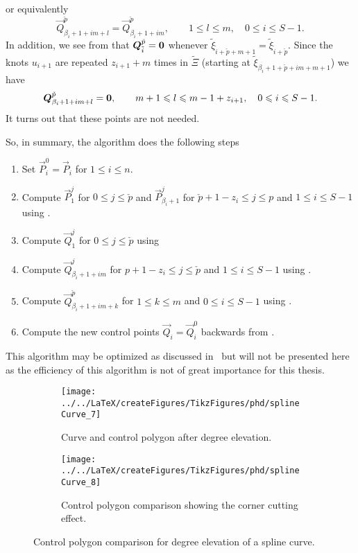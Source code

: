 or equivalently
\begin{equation}\label{Eq:coeffFormula5}
	\vec{Q}_{\beta_i+1+i m+l}^{\check{p}} = \vec{Q}_{\beta_i+1+i m}^{\check{p}},\qquad 1 \leq l \leq m,\quad 0\leq i \leq S-1. 
\end{equation}
In addition, we see from  that $\vec{Q}_{\tilde{i}}^{\check{p}}=\zerovec$ whenever $\tilde{\xi}_{\tilde{i}+\check{p}+m+1} = \tilde{\xi}_{\tilde{i}+\check{p}}$. Since the knots $u_{i+1}$ are repeated $z_{i+1}+m$ times in $\tilde{\Xi}$ (starting at $\tilde{\xi}_{\beta_i+1+\check{p}+im+m+1}$) we have
\begin{equation*}
	\vec{Q}_{\beta_i+1+i m+l}^{\check{p}}=\zerovec,\qquad m+1 \leq l \leq m - 1 + z_{i+1},\quad 0\leq i \leq S-1. 
\end{equation*}
It turns out that these points are not needed.

So, in summary, the algorithm does the following steps
\begin{enumerate}
	\item Set $\vec{P}_i^0 = \vec{P}_i$ for $1\leq i\leq n$. 
	\item Compute $\vec{P}_1^j$ for $0 \leq j \leq \check{p}$ and $\vec{P}_{\beta_i+1}^j$ for $\check{p}+1-z_i\leq j\leq p$ and $1\leq i\leq S-1$ using .
	\item Compute $\vec{Q}_1^j$ for $0 \leq j \leq \check{p}$ using  
	\item Compute $\vec{Q}_{\beta_i+1+im}^j$ for $p+1-z_i\leq j\leq \check{p}$ and $1\leq i\leq S-1$ using .
	\item Compute $\vec{Q}_{\beta_i+1+i m+k}^{\check{p}}$ for $1 \leq k \leq m$ and $0\leq i \leq S-1$ using . 
	\item Compute the new control points $\vec{Q}_i=\vec{Q}_i^0$ backwards from .
\end{enumerate}
This algorithm may be optimized as discussed in~\cite{Huang2004ede} but will not be presented here as the efficiency of this algorithm is not of great importance for this thesis.

\begin{figure}
        \centering        
        \begin{subfigure}{0.49\textwidth}
       		\centering
			\texttt{[image: ../../LaTeX/createFigures/TikzFigures/phd/splineCurve\_7]}
            \caption{Curve and control polygon after degree elevation.}
            \label{Fig:BsplineCurveDegreeElevated}
        \end{subfigure}%
        \hspace*{0.02\textwidth}%
        \begin{subfigure}{0.49\textwidth}
       		\centering
			\texttt{[image: ../../LaTeX/createFigures/TikzFigures/phd/splineCurve\_8]}
            \caption{Control polygon comparison showing the corner cutting effect.}
            \label{Fig:BsplineCurveDegreeElevated2}
        \end{subfigure}
        \caption{Control polygon comparison for degree elevation of a spline curve.}
\end{figure}

